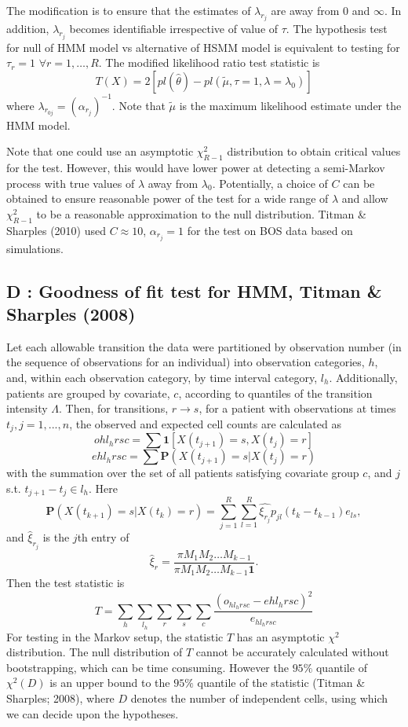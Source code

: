 \documentclass{uwstat572}
\begin{document}
The modification is to ensure that the estimates of $\lambda_{r_j}$ are away from $0$ and $\infty$. In addition, $\lambda_{r_j}$ becomes identifiable irrespective of value of $\tau$. The hypothesis test for null of HMM model vs alternative of HSMM model is equivalent to testing for $\tau_r=1$ $\forall r=1,\ldots,R$. The modified likelihood ratio test statistic is
\[
T(X) = 2\left[pl(\hat{\theta})-pl(\tilde{\mu}, \tau=1,\lambda=\lambda_0)\right]
\] where $\lambda_{r_{0j}}=(\alpha_{r_j})^{-1}$. Note that $\tilde{\mu}$ is the maximum likelihood estimate under the HMM model.

Note that one could use an asymptotic $\chi^2_{R-1}$ distribution to obtain critical values for the test. However, this would have lower power at detecting a semi-Markov process with true values of $\lambda$ away from $\lambda_0$. Potentially, a choice of $C$ can be obtained to ensure reasonable power of the test for a wide range of $\lambda$ and allow $\chi^2_{R-1}$ to be a reasonable approximation to the null distribution. Titman \& Sharples (2010) used $C \approx 10$, $\alpha_{r_j}=1$ for the test on BOS data based on simulations.
\subsection*{D : Goodness of fit test for HMM, Titman \& Sharples (2008)}
Let each allowable transition the data were partitioned by observation number (in the sequence of observations for an individual) into observation categories, $h$, and, within each observation category, by time interval category, $l_h$. Additionally, patients are grouped by covariate, $c$, according to quantiles of the transition intensity $\Lambda$. Then, for transitions, $r\rightarrow s$, for a patient with observations at times $t_j, j=1,...,n$, the observed and expected cell counts are calculated as
\[
ohl_h rsc = \sum \mathbf{1} \left[ X(t_{j+1})=s,X(t_j)=r \right]
\]
\[
ehl_h rsc = \sum \mathbf{P} (X(t_{j+1})=s|X(t_j)=r)
\]
with the summation over the set of all patients satisfying covariate group $c$, and $j$ s.t. $t_{j+1}-t_j \in l_h$. Here
\[
\mathbf{P} (X(t_{k+1})=s|X(t_k)=r)= \sum_{j=1}^R \sum_{l=1}^R \hat{\xi_{r_j}}p_{jl}(t_k - t_{k-1}) e_{ls},
\]
and $\hat{\xi}_{r_j}$ is the $j$th entry of \[\hat{\xi}_r=\frac{\pi M_1 M_2 \ldots M_{k-1}}{\pi M_1 M_2 \ldots M_{k-1} \mathbf{1}}.\]
Then the test statistic is 
\[
T=\sum_{h}\sum_{l_h}\sum_{r}\sum_{s}\sum_{c}\frac{(o_{hl_h rsc}-ehl_h rsc)^2}{e_{hl_h rsc}}
\]
For testing in the Markov setup, the statistic $T$ has an asymptotic $\chi^2$ distribution. The null distribution of $T$ cannot be accurately calculated without bootstrapping, which can be time consuming. However the $95\%$ quantile of $\chi^2(D)$ is an upper bound to the $95\%$ quantile of the statistic (Titman \& Sharples; 2008), where $D$ denotes the number of independent cells, using which we can decide upon the hypotheses.
\end{document}
